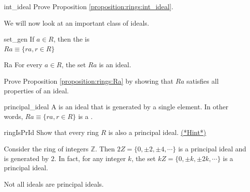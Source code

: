 \begin{exercise}{int_ideal}
Prove Proposition \ref{proposition:rings:int_ideal}.
\end{exercise}

We will now look at an important class of ideals.

\begin{defn}{set_gen}
If $a\in R$, then the  is \\
$Ra\equiv \{ra, r\in R\}$
\end{defn}

\begin{prop}{Ra}
For every $a\in R$, the set $Ra$ is an ideal.
\end{prop}

\begin{exercise}{}
Prove Proposition \ref{proposition:rings:Ra} by showing that $Ra$ satisfies all properties of an ideal.
\end{exercise}


\begin{defn}{principal_ideal}
A  is an ideal that is generated by a single element. In other words, $Ra\equiv \{ra,r\in R\}$ is a .
\end{defn}

\begin{exercise}{ringIsPrId}
    Show that every ring $R$ is also a principal ideal. \hyperref[ringsHints]{(*Hint*)} 
\end{exercise}

\begin{example}{}
Consider the ring of integers ${\mathbb Z}$. Then $2Z=\{0,\displaystyle \pm 2,\displaystyle \pm 4,\cdots\}$ is a principal ideal and is generated by $2$.  In fact, for any integer $k$, the set  $kZ=\{0,\displaystyle \pm k,\displaystyle \pm 2k,\cdots\}$ is a principal ideal.
\end{example}


Not all ideals are principal ideals.

